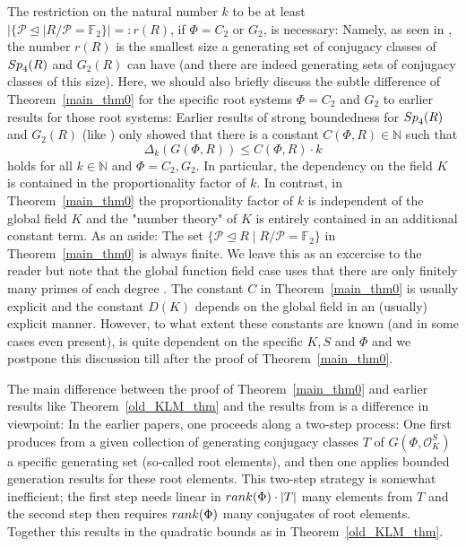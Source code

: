 \documentclass[12pt]{amsart}
\newcommand{\C}[1]{{\mathcal #1}}
\theoremstyle{definition}\newtheorem{definition}[theorem]{Definition}
\theoremstyle{remark}\newtheorem{remark}[theorem]{Remark}
\theoremstyle{definition}\newtheorem{case}{Case}
\begin{document}
The restriction on the natural number $k$ to be at least $|\{\C P\unlhd\mid R/\C P=\mathbb{F}_2\}|=:r(R)$, if $\Phi=C_2$ or $G_2$, is necessary: Namely, as seen in \cite[Theorem~6.3]{General_strong_bound}, the number $r(R)$ is the smallest size a generating set of conjugacy classes of ${\rm Sp}_4(R)$ and $G_2(R)$ can have (and there are indeed generating sets of conjugacy classes of this size). Here, we should also briefly discuss the subtle difference of Theorem~\ref{main_thm0} for the specific root systems $\Phi=C_2$ and $G_2$ to earlier results for those root systems: Earlier results of strong boundedness for ${\rm Sp}_4(R)$ and $G_2(R)$ (like \cite[Theorem~5.13]{General_strong_bound}) only showed that there is a constant $C(\Phi,R)\in\mathbb{N}$ such that
$$
\Delta_k(G(\Phi,R))\leq C(\Phi,R)\cdot k
$$
holds for all $k\in\mathbb{N}$ and $\Phi=C_2,G_2.$ In particular, the dependency on the field $K$ is contained in the proportionality factor of $k$. In contrast, in Theorem~\ref{main_thm0} the proportionality factor of $k$ is independent of the global field $K$ and the "number theory" of $K$ is entirely contained in an additional constant term. As an aside: The set $\{\C P\unlhd R\mid R/\C P=\mathbb{F}_2\}$ in Theorem~\ref{main_thm0} is always finite. We leave this as an excercise to the reader but note that the global function field case uses that there are only finitely many primes of each degree \cite[Theorem~5.12]{MR1876657}. The constant $C$ in Theorem~\ref{main_thm0} is usually explicit and the constant $D(K)$ depends on the global field in an (usually) explicit manner. However, to what extent these constants are known (and in some cases even present), is quite dependent on the specific $K,S$ and $\Phi$ and we postpone this discussion till after the proof of Theorem~\ref{main_thm0}. 

The main difference between the proof of Theorem~\ref{main_thm0} and earlier results like Theorem~\ref{old_KLM_thm} and the results from \cite{Chevalley_positive_char_tentative,explicit_strong_bound_sp_2n,General_strong_bound} is a difference in viewpoint: In the earlier papers, one proceeds along a two-step process: One first produces from a given collection of generating conjugacy classes $T$ of $G(\Phi,\mathscr{O}_K^S)$ a specific generating set (so-called root elements), and then one applies bounded generation results for these root elements. This two-step strategy is somewhat inefficient; the first step needs linear in ${\rm rank}(\Phi)\cdot|T|$ many elements from $T$ and the second step then requires ${\rm rank}(\Phi)$ many conjugates of root elements. Together this results in the quadratic bounds as in Theorem~\ref{old_KLM_thm}.
\end{document}
